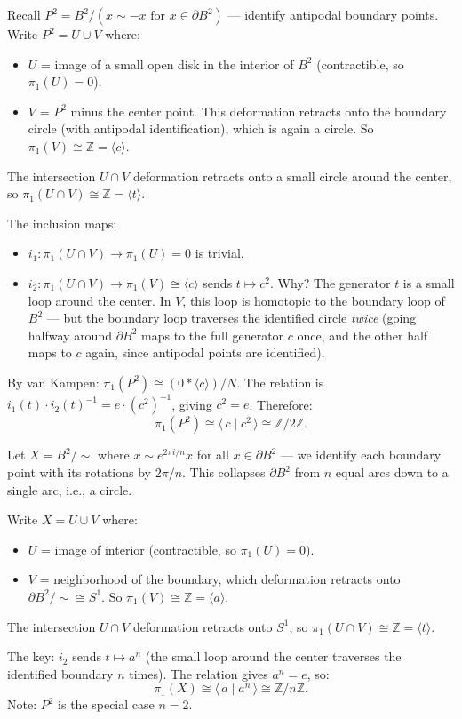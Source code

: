 \documentclass[11pt]{report}
\begin{document}
\begin{exbox}
Recall $P^2 = B^2 / (x \sim -x \text{ for } x \in \partial B^2)$ --- identify antipodal boundary points. Write $P^2 = U \cup V$ where:
\begin{itemize}[nosep]
    \item $U$ = image of a small open disk in the interior of $B^2$ (contractible, so $\pi_1(U) = 0$).
    \item $V$ = $P^2$ minus the center point. This deformation retracts onto the boundary circle (with antipodal identification), which is again a circle. So $\pi_1(V) \cong \mathbb{Z} = \langle c \rangle$.
\end{itemize}
The intersection $U \cap V$ deformation retracts onto a small circle around the center, so $\pi_1(U \cap V) \cong \mathbb{Z} = \langle t \rangle$.

The inclusion maps:
\begin{itemize}[nosep]
    \item $i_1: \pi_1(U \cap V) \to \pi_1(U) = 0$ is trivial.
    \item $i_2: \pi_1(U \cap V) \to \pi_1(V) \cong \langle c \rangle$ sends $t \mapsto c^2$. Why? The generator $t$ is a small loop around the center. In $V$, this loop is homotopic to the boundary loop of $B^2$ --- but the boundary loop traverses the identified circle \emph{twice} (going halfway around $\partial B^2$ maps to the full generator $c$ once, and the other half maps to $c$ again, since antipodal points are identified).
\end{itemize}
By van Kampen: $\pi_1(P^2) \cong (0 * \langle c \rangle) / N$. The relation is $i_1(t) \cdot i_2(t)^{-1} = e \cdot (c^2)^{-1}$, giving $c^2 = e$. Therefore:
\[\pi_1(P^2) \cong \langle\, c \mid c^2 \,\rangle \cong \mathbb{Z}/2\mathbb{Z}.\]
\end{exbox}

\begin{exbox}
Let $X = B^2 / {\sim}$ where $x \sim e^{2\pi i / n} x$ for all $x \in \partial B^2$ --- we identify each boundary point with its rotations by $2\pi/n$. This collapses $\partial B^2$ from $n$ equal arcs down to a single arc, i.e., a circle.

Write $X = U \cup V$ where:
\begin{itemize}[nosep]
    \item $U$ = image of interior (contractible, so $\pi_1(U) = 0$).
    \item $V$ = neighborhood of the boundary, which deformation retracts onto $\partial B^2 / {\sim} \cong S^1$. So $\pi_1(V) \cong \mathbb{Z} = \langle a \rangle$.
\end{itemize}
The intersection $U \cap V$ deformation retracts onto $S^1$, so $\pi_1(U \cap V) \cong \mathbb{Z} = \langle t \rangle$.

The key: $i_2$ sends $t \mapsto a^n$ (the small loop around the center traverses the identified boundary $n$ times). The relation gives $a^n = e$, so:
\[\pi_1(X) \cong \langle\, a \mid a^n \,\rangle \cong \mathbb{Z}/n\mathbb{Z}.\]
Note: $P^2$ is the special case $n = 2$.
\end{exbox}
\end{document}
